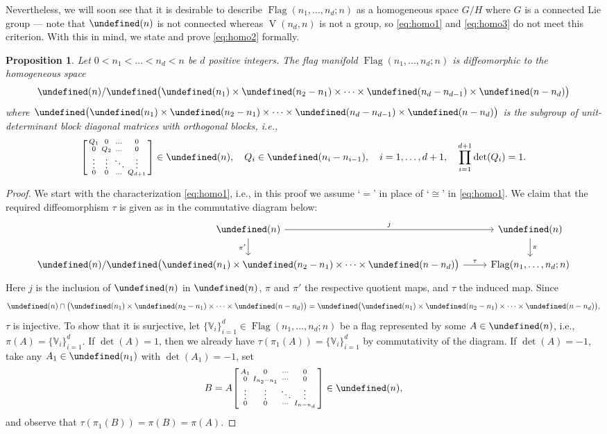 \documentclass[11pt,reqno]{amsart}%
\newtheorem{proposition}[theorem]{Proposition}
\theoremstyle{definition}
\theoremstyle{remark}
\let\O\undefined
\let\S\undefined
\let\SO\undefined
\DeclareMathOperator{\V}{V}
\DeclareMathOperator{\Flag}{Flag}
\DeclareMathOperator{\O}{O}
\DeclareMathOperator{\S}{S}
\DeclareMathOperator{\SO}{SO}
\begin{document}
Nevertheless, we will soon see that it is desirable to describe $\Flag(n_1,\dots,n_d;n)$ as a homogeneous space $G/H$ where $G$ is a connected Lie group --- note that $\O(n)$ is not connected whereas $\V(n_d,n)$ is not a group, so \eqref{eq:homo1} and \eqref{eq:homo3} do not meet this criterion. With this in mind, we state and prove \eqref{eq:homo2} formally.
\begin{proposition}\label{prop:equivalent definition of flag manifold}
Let $0 < n_1< \dots < n_d < n$ be  $d$ positive integers. The flag manifold $\Flag(n_1,\dots, n_d;n)$ is diffeomorphic to the homogeneous space
\[
\SO(n) / \S\bigl(\O(n_1) \times \O(n_2 - n_1) \times \dots \times \O(n_d - n_{d-1}) \times \O(n-n_d) \bigr)
\]
where  $\S\bigl(\O(n_1) \times \O(n_2 - n_1) \times \dots \times \O(n_d - n_{d-1}) \times \O(n-n_d) \bigr)$ is the subgroup of unit-determinant block diagonal matrices with orthogonal blocks, i.e.,
\[
\begin{bsmallmatrix}
Q_1 & 0 & \dots & 0 \\
0 & Q_2 & \dots & 0\\
\vdots & \vdots & \ddots & \vdots \\
0 & 0 & \dots & Q_{d+1}
\end{bsmallmatrix} \in \O(n), \quad Q_i\in \O(n_i-n_{i-1}), \quad i=1,\dots, d+1, \quad \prod_{i=1}^{d+1} \det (Q_i) = 1.
\]
\end{proposition}
\begin{proof}
We start with the characterization \eqref{eq:homo1}, i.e., in this proof we assume `$=$' in place of `$\cong$' in \eqref{eq:homo1}.
We claim that the required diffeomorphism $\tau$ is given as in the commutative diagram below:
\[\begin{tikzcd}
\SO(n) \arrow{r}{j} \arrow[swap]{d}{\pi'} & \O(n) \arrow{d}{\pi} \\
\SO(n) / \S\bigl(\O(n_1) \times \O(n_2 - n_1) \times \dots \times \O(n-n_d) \bigr) \arrow{r}{\tau} & \Flag(n_1,\dots, n_d;n) 
\end{tikzcd}
\]
Here $j$ is the inclusion of $\SO(n)$ in $\O(n)$, $\pi$ and $\pi'$ the respective quotient maps, and $\tau$ the induced map. Since
\[
\SO(n)  \cap  \bigl(\O(n_1) \times \O(n_2 - n_1) \times \dots  \times \O(n-n_d) \bigr)=  \S\bigl(\O(n_1) \times \O(n_2 - n_1) \times \dots \times \O(n - n_{d}) \bigr),
\]
$\tau$ is injective. To show that it is surjective, let $\{\mathbb{V}_i\}_{i=1}^d \in \Flag(n_1,\dots, n_d;n)$ be a flag represented by some $A\in \O(n)$, i.e., $\pi(A) = \{\mathbb{V}_i\}_{i=1}^d$. If $\det(A) = 1$, then we already have $\tau (\pi_1(A)) = \{\mathbb{V}_i\}_{i=1}^d$ by commutativity of the diagram. If $\det(A) = -1$, take any $A_1\in \O(n_1)$ with $\det(A_1)=-1$, set
\[
B = A \begin{bsmallmatrix}
A_1 & 0 &\cdots & 0 \\
0 & I_{n_2 - n_1} & \cdots & 0 \\
\vdots & \vdots & \ddots & \vdots \\
0 & 0 & \cdots & I_{n - n_d}
\end{bsmallmatrix} \in \SO(n),
\]
and observe that $\tau (\pi_1(B)) = \pi (B) = \pi (A)$.
\end{proof}
\end{document}

